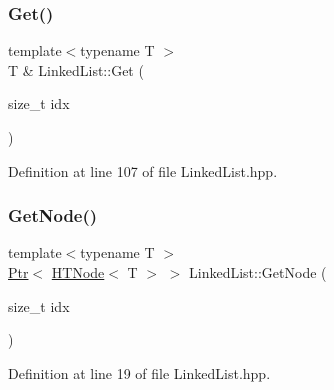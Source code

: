 \subsubsection{\texorpdfstring{Get()}{Get()}}
{\footnotesize\ttfamily template$<$typename T $>$ \\
T \& Linked\+List\+::\+Get (\begin{DoxyParamCaption}\item[{size\+\_\+t}]{idx }\end{DoxyParamCaption})}



Definition at line 107 of file Linked\+List.\+hpp.


\begin{DoxyCode}{0}

\end{DoxyCode}
\mbox{\label{classpdl_1_1collection_1_1_linked_list_ae3dd2c2ba1b4e01fa3b5685d933a4ab5}} 
\subsubsection{\texorpdfstring{GetNode()}{GetNode()}}
{\footnotesize\ttfamily template$<$typename T $>$ \\
\mbox{\hyperlink{classpdl_1_1memory_1_1_ptr}{Ptr}}$<$ \mbox{\hyperlink{classpdl_1_1collection_1_1_h_t_node}{H\+T\+Node}}$<$ T $>$ $>$ Linked\+List\+::\+Get\+Node (\begin{DoxyParamCaption}\item[{size\+\_\+t}]{idx }\end{DoxyParamCaption})\hspace{0.3cm}{\ttfamily [protected]}}



Definition at line 19 of file Linked\+List.\+hpp.


